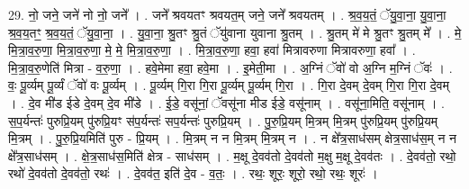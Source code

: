 \documentclass[17pt]{extarticle}
\begin{document}
29. नो॒ जने॒ जने॑ नो नो॒ जने᳚ । . जने᳚ श्रवयतꣳ श्रवयत॒म् जने॒ जने᳚ श्रवयतम् । . श्र॒व॒य॒तं॒ ॅयु॒वा॒ना॒ यु॒वा॒ना॒ श्र॒व॒य॒तꣳ॒॒ श्र॒व॒य॒तं॒ ॅयु॒वा॒ना॒ । . यु॒वा॒ना॒ श्रु॒तꣳ श्रु॒तं ॅयु॑वाना युवाना श्रु॒तम् । . श्रु॒तम् मे॑ मे श्रु॒तꣳ श्रु॒तम् मे᳚ । . मे॒ मि॒त्रा॒व॒रु॒णा॒ मि॒त्रा॒व॒रु॒णा॒ मे॒ मे॒ मि॒त्रा॒व॒रु॒णा॒ । . मि॒त्रा॒व॒रु॒णा॒ हवा॒ हवा॑ मित्रावरुणा मित्रावरुणा॒ हवा᳚ । . मि॒त्रा॒व॒रु॒णेति॑ मित्रा - व॒रु॒णा॒ । . हवे॒मेमा हवा॒ हवे॒मा । . इ॒मेती॒मा । . अ॒ग्निं ॅवो॑ वो अ॒ग्नि म॒ग्निं ॅवः॑ । . वः॒ पू॒र्व्यम् पू॒र्व्यं ॅवो॑ वः पू॒र्व्यम् । . पू॒र्व्यम् गि॒रा गि॒रा पू॒र्व्यम् पू॒र्व्यम् गि॒रा । . गि॒रा दे॒वम् दे॒वम् गि॒रा गि॒रा दे॒वम् । . दे॒व मी॑ड ईडे दे॒वम् दे॒व मी॑डे । . ई॒डे॒ वसू॑नां॒ ॅवसू॑ना मीड ईडे॒ वसू॑नाम् । . वसू॑ना॒मिति॒ वसू॑नाम् । . स॒प॒र्यन्तः॑ पुरुप्रि॒यम् पु॑रुप्रि॒यꣳ स॑प॒र्यन्तः॑ सप॒र्यन्तः॑ पुरुप्रि॒यम् । . पु॒रु॒प्रि॒यम् मि॒त्रम् मि॒त्रम् पु॑रुप्रि॒यम् पु॑रुप्रि॒यम् मि॒त्रम् । . पु॒रु॒प्रि॒यमिति॑ पुरु - प्रि॒यम् । . मि॒त्रम् न न मि॒त्रम् मि॒त्रम् न । . न क्षे᳚त्र॒साध॑सम् क्षेत्र॒साध॑स॒म् न न क्षे᳚त्र॒साध॑सम् । . क्षे॒त्र॒साध॑स॒मिति॑ क्षेत्र - साध॑सम् । . म॒क्षू दे॒वव॑तो दे॒वव॑तो म॒क्षु म॒क्षू दे॒वव॑तः । . दे॒वव॑तो॒ रथो॒ रथो॑ दे॒वव॑तो दे॒वव॑तो॒ रथः॑ । . दे॒वव॑त॒ इति॑ दे॒व - व॒तः॒ । . रथः॒ शूरः॒ शूरो॒ रथो॒ रथः॒ शूरः॑ । \newline
\end{document}
